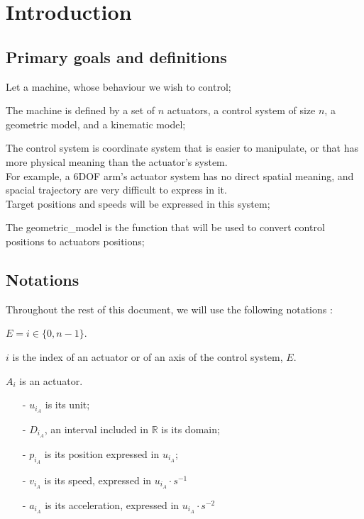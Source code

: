 \newpage

\section{Introduction}


\subsection{Primary goals and definitions}

Let a machine, whose behaviour we wish to control;\newline

The machine is defined by a set of $n$ actuators, a control system of size $n$, a geometric model, and a kinematic
model;\newline

The control system is coordinate system that is easier to manipulate, or that has more physical meaning than the
actuator's system.\\
For example, a 6DOF arm's actuator system has no direct spatial meaning, and spacial trajectory are very difficult
to express in it.\\
Target positions and speeds will be expressed in this system;\newline

The geometric_model is the function that will be used to convert control positions to actuators positions;


\subsection{Notations}

Throughout the rest of this document, we will use the following notations :\newline

$E = {i\in \{0, n-1\}}$.\newline

$i$ is the index of an actuator or of an axis of the control system, $E$.\newline

$A_i$ is an actuator.
\begin{itemize}
    \item[-] $u_{i_A}$ is its unit;
    \item[-] $D_{i_A}$, an interval included in $\mathbb{R}$ is its domain;
    \item[-] $p_{i_A}$ is its position expressed in $u_{i_A}$;
    \item[-] $v_{i_A}$ is its speed, expressed in $u_{i_A} \cdot s^{-1}$
    \item[-] $a_{i_A}$ is its acceleration, expressed in $u_{i_A} \cdot s^{-2}$\newline
\end{itemize}

